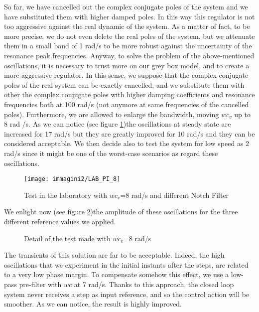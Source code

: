 So far, we have cancelled out the complex conjugate poles of the system and we have substituted them with higher damped poles. In this way this regulator is not too aggressive against the real dynamic of the system. As a matter of fact, to be more precise, we do not even delete the real poles of the system, but we attenuate them in a small band of 1 rad/s to be more robust against the uncertainty of the resonance peak frequencies. Anyway, to solve the problem of the above-mentioned oscillations, it is necessary to trust more on our grey box model, and to create a more aggressive regulator. In this sense, we suppose that the complex conjugate poles of the real system can be exactly cancelled, and we substitute them with other the complex conjugate poles with higher damping coefficients and resonance frequencies both at 100 rad/s (not anymore at same frequencies of the cancelled poles). Furthermore, we are allowed to enlarge the bandwidth, moving  $wc_{v}$ up to 8 rad /s. 
\newline As we can notice (see figure \ref{fig:LAB_PI_8})the oscillations at steady state are increased for 17 rad/s but they are greatly improved for 10 rad/s and they can be considered acceptable. We then decide also to test the system for low speed as 2 rad/s  since it might be one of the worst-case scenarios as regard these oscillations.

\begin{figure}[h]
	\centering
	\texttt{[image: immagini2/LAB\_PI\_8]}
	\caption{Test in the laboratory with $wc_{v}$=8 rad/s and different Notch Filter}
	\label{fig:LAB_PI_8}
\end{figure}

We enlight now (see figure \ref{fig:Detail_PI})the amplitude of these oscillations for the three different reference values we applied.

\begin{figure}[h]
	\centering
	\quad
	\quad
	\caption{Detail of the test made with $wc_{v}$=8 rad/s }
	\label{fig:Detail_PI}
\end{figure}

The transients of this solution are far to be acceptable. Indeed, the high oscillations that we experiment in the initial instants after the steps, are related to a very low phase margin. To compensate somehow this effect, we use a low-pass pre-filter with $wc$ at 7 rad/s. Thanks to this approach, the closed loop system never receives a step as input reference, and so the control action will be smoother. As we can notice, the result is highly improved.

